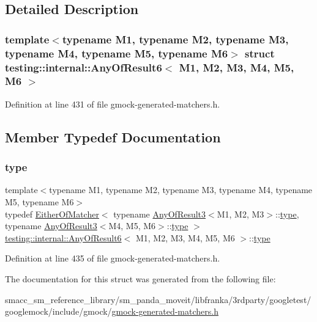 \subsection{Detailed Description}
\subsubsection*{template$<$typename M1, typename M2, typename M3, typename M4, typename M5, typename M6$>$\newline
struct testing\+::internal\+::\+Any\+Of\+Result6$<$ M1, M2, M3, M4, M5, M6 $>$}



Definition at line 431 of file gmock-\/generated-\/matchers.\+h.



\subsection{Member Typedef Documentation}
\mbox{\label{structtesting_1_1internal_1_1AnyOfResult6_a15837eb05d9ac5a76c20d344a4988dd1}} 
\subsubsection{\texorpdfstring{type}{type}}
{\footnotesize\ttfamily template$<$typename M1, typename M2, typename M3, typename M4, typename M5, typename M6$>$ \\
typedef \hyperlink{classtesting_1_1internal_1_1EitherOfMatcher}{Either\+Of\+Matcher}$<$ typename \hyperlink{structtesting_1_1internal_1_1AnyOfResult3}{Any\+Of\+Result3}$<$M1, M2, M3$>$\+::\hyperlink{structtesting_1_1internal_1_1AnyOfResult6_a15837eb05d9ac5a76c20d344a4988dd1}{type}, typename \hyperlink{structtesting_1_1internal_1_1AnyOfResult3}{Any\+Of\+Result3}$<$M4, M5, M6$>$\+::\hyperlink{structtesting_1_1internal_1_1AnyOfResult6_a15837eb05d9ac5a76c20d344a4988dd1}{type} $>$ \hyperlink{structtesting_1_1internal_1_1AnyOfResult6}{testing\+::internal\+::\+Any\+Of\+Result6}$<$ M1, M2, M3, M4, M5, M6 $>$\+::\hyperlink{structtesting_1_1internal_1_1AnyOfResult6_a15837eb05d9ac5a76c20d344a4988dd1}{type}}



Definition at line 435 of file gmock-\/generated-\/matchers.\+h.



The documentation for this struct was generated from the following file\+:\begin{DoxyCompactItemize}
\item 
smacc\+\_\+sm\+\_\+reference\+\_\+library/sm\+\_\+panda\+\_\+moveit/libfranka/3rdparty/googletest/googlemock/include/gmock/\hyperlink{gmock-generated-matchers_8h}{gmock-\/generated-\/matchers.\+h}\end{DoxyCompactItemize}
